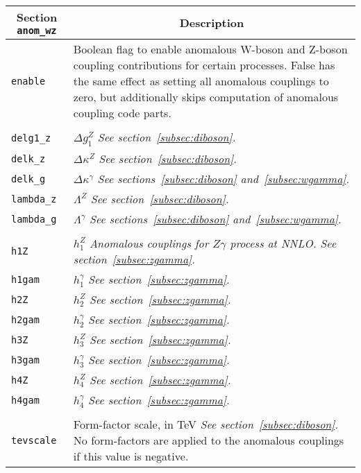 	\begin{longtable}{p{1.5cm}p{12cm}}
		\hline
		\multicolumn{1}{c}{{\textbf{Section} \texttt{anom\_wz}}} & \multicolumn{1}{c}{{\textbf{Description}}} \\ 
		\hline
		{\tt enable} &  Boolean flag to enable anomalous W-boson and Z-boson coupling contributions for certain 
		processes. 	False has the same effect as setting all anomalous couplings to zero, but additionally skips 
		computation of anomalous coupling code parts. \\
		 & \\
		{\tt delg1\_z} & $\Delta g_1^Z$ {\it See section~\ref{subsec:diboson}.} \\
		{\tt delk\_z} & $\Delta\kappa^Z$ {\it See section~\ref{subsec:diboson}.} \\
		{\tt delk\_g} & $\Delta\kappa^\gamma$ {\it See sections~\ref{subsec:diboson} and~\ref{subsec:wgamma}.} \\
		{\tt lambda\_z} & $\Lambda^Z$ {\it See section~\ref{subsec:diboson}.} \\
		{\tt lambda\_g} & $\Lambda^\gamma$ {\it See sections~\ref{subsec:diboson} and~\ref{subsec:wgamma}.} \\
		 & \\
		{\tt h1Z} & $h_1^Z$ {\it Anomalous couplings for $Z\gamma$ process at NNLO. See 
		section~\ref{subsec:zgamma}.} \\
		{\tt h1gam} & $h_1^\gamma$ {\it See section~\ref{subsec:zgamma}.} \\
		{\tt h2Z} & $h_2^Z$ {\it See section~\ref{subsec:zgamma}.} \\
		{\tt h2gam} & $h_2^\gamma$ {\it See section~\ref{subsec:zgamma}.} \\
		{\tt h3Z} & $h_3^Z$ {\it See section~\ref{subsec:zgamma}.} \\
		{\tt h3gam} & $h_3^\gamma$ {\it See section~\ref{subsec:zgamma}.} \\
		{\tt h4Z} & $h_4^Z$ {\it See section~\ref{subsec:zgamma}.} \\
		{\tt h4gam} & $h_4^\gamma$ {\it See section~\ref{subsec:zgamma}.} \\
		 & \\
		{\tt tevscale} & Form-factor scale, in TeV {\it See section~\ref{subsec:diboson}.} 
		No form-factors are applied to the anomalous couplings if this value is negative. \\
		\hline
	\end{longtable}

\clearpage
